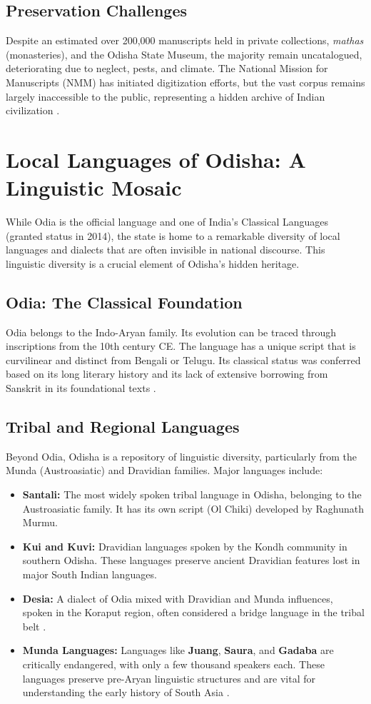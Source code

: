 \documentclass[12pt]{article}
\begin{document}
\subsection{Preservation Challenges}
Despite an estimated over 200,000 manuscripts held in private collections, \textit{mathas} (monasteries), and the Odisha State Museum, the majority remain uncatalogued, deteriorating due to neglect, pests, and climate. The National Mission for Manuscripts (NMM) has initiated digitization efforts, but the vast corpus remains largely inaccessible to the public, representing a hidden archive of Indian civilization \cite{nmm}.

\section{Local Languages of Odisha: A Linguistic Mosaic}
While Odia is the official language and one of India's Classical Languages (granted status in 2014), the state is home to a remarkable diversity of local languages and dialects that are often invisible in national discourse. This linguistic diversity is a crucial element of Odisha’s hidden heritage.

\subsection{Odia: The Classical Foundation}
Odia belongs to the Indo-Aryan family. Its evolution can be traced through inscriptions from the 10th century CE. The language has a unique script that is curvilinear and distinct from Bengali or Telugu. Its classical status was conferred based on its long literary history and its lack of extensive borrowing from Sanskrit in its foundational texts \cite{mishra_classical}.

\subsection{Tribal and Regional Languages}
Beyond Odia, Odisha is a repository of linguistic diversity, particularly from the Munda (Austroasiatic) and Dravidian families. Major languages include:
\begin{itemize}
    \item \textbf{Santali:} The most widely spoken tribal language in Odisha, belonging to the Austroasiatic family. It has its own script (Ol Chiki) developed by Raghunath Murmu.
    \item \textbf{Kui and Kuvi:} Dravidian languages spoken by the Kondh community in southern Odisha. These languages preserve ancient Dravidian features lost in major South Indian languages.
    \item \textbf{Desia:} A dialect of Odia mixed with Dravidian and Munda influences, spoken in the Koraput region, often considered a bridge language in the tribal belt \cite{mohanty_tribal}.
    \item \textbf{Munda Languages:} Languages like \textbf{Juang}, \textbf{Saura}, and \textbf{Gadaba} are critically endangered, with only a few thousand speakers each. These languages preserve pre-Aryan linguistic structures and are vital for understanding the early history of South Asia \cite{anderson_munda}.
\end{itemize}
\end{document}
